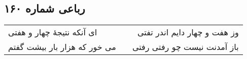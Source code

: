 \begin{center}
\section*{رباعی شماره ۱۶۰}
\label{sec:sh160}
\begin{longtable}{l p{0.5cm} r}
ای آنکه نتیجهٔ چهار و هفتی
&&
وز هفت و چهار دایم اندر تفتی
\\
می خور که هزار بار بیشت گفتم
&&
باز آمدنت نیست چو رفتی رفتی
\\
\end{longtable}
\end{center}
